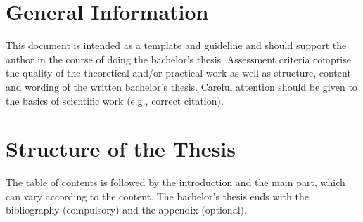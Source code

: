 \section{General Information}

This document is intended as a template and guideline and should support the author in the course of doing the bachelor's thesis.
Assessment criteria comprise the quality of the theoretical and/or practical work as well as structure, content and wording of the written bachelor's thesis. Careful attention should be given to the basics of scientific work (e.g., correct citation).

\section{Structure of the Thesis}

The table of contents is followed by the introduction and the main part, which can vary according to the content. The bachelor's thesis ends with the bibliography (compulsory) and the appendix (optional).

